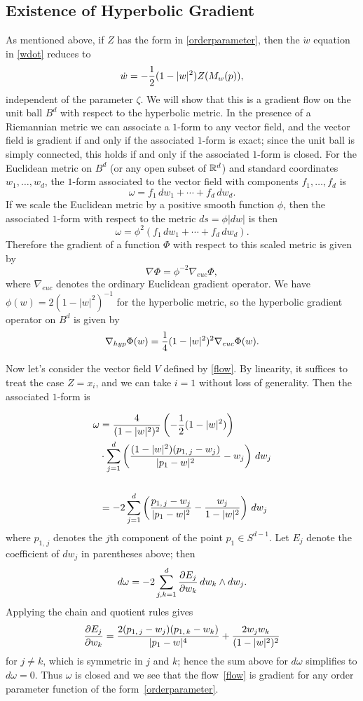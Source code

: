 \documentclass[%
 aip,
 amsmath,amssymb,
 reprint,%
]{revtex4-1}
\begin{document}
\subsection{\label{sec:level2}Existence of Hyperbolic Gradient}
As mentioned above, if $Z$ has the form in \eqref{orderparameter}, then the $\dot w$ equation in \eqref{wdot} reduces to
\begin{equation}
\dot w = -{1 \over 2} (1-|w|^2) Z(M_w(p)), \label{flow}
\end{equation}
independent of the parameter $\zeta$.  We will show that this is a gradient flow on the unit ball $B^d$ with respect to the hyperbolic metric.  In the presence of a Riemannian metric we can associate a $1$-form to any vector field, and the vector field is gradient if and only if the associated $1$-form is exact; since the unit ball is simply connected, this holds if and only if the associated 
$1$-form is closed.  For the Euclidean metric on $B^d$ (or any open subset of ${\Bbb R}^d$) and standard coordinates $w_1,  \dots, w_d$, the $1$-form associated to the vector field with components $f_1,  \dots, f_d$ is
$$
\omega = f_1 \, dw_1 + \cdots + f_d \, dw_d.
$$
If we scale the Euclidean metric by a positive smooth function $\phi$, then the associated $1$-form with respect to the metric $ds = \phi |dw|$  is then
$$
\omega = \phi^2 ( f_1 \, dw_1 + \cdots + f_d \, dw_d).
$$
Therefore the gradient of a function $\Phi$ with respect to this scaled metric is given by
$$
\nabla \Phi = \phi ^{-2} \nabla_{euc} \Phi,
$$
where $\nabla_{euc}$ denotes the ordinary Euclidean gradient operator. We have $\phi(w) = 2(1-|w|^2)^{-1}$ for the hyperbolic metric, so the hyperbolic gradient operator on $B^d$ is given by
$$
\nabla_{hyp} \Phi (w) = {1 \over 4} (1-|w|^2)^2 \nabla_{euc} \Phi (w).
$$


Now let's consider the vector field $V$ defined by \eqref{flow}.  By linearity, it suffices to treat the case $Z = x_i$, and we can take $i=1$ without loss of generality.   Then the associated $1$-form is

\begin{align*}
\omega &= {4  \over ( 1- |w|^2)^2 } \left( -{1 \over 2} (1-|w|^2)  \right) \\ &\cdot \sum_{j=1}^d  \left( {(1-|w|^2) (p_{1,\, j}  - w_j)  \over | p_1 - w|^2} - w_j \right) \, dw_j \cr \\
&= -2  \sum_{j=1}^d  \left(  {p_{1,\,  j}  - w_j  \over | p_1 - w|^2 } - { w_j  \over 1-|w|^2} \right) \, dw_j 
\end{align*}
where $p_{1, \, j}$ denotes the $j$th component of the point $p_1 \in S^{d-1}$.  Let  $E_j$ denote the coefficient of $dw_j$ in parentheses above; then
$$
d \omega = -2 \sum_{j, k = 1}^d {\partial E_j \over \partial w_k} \, dw_k \wedge dw_j.
$$
 Applying the chain and quotient rules gives
$$
{\partial E_j \over \partial w_k} = { 2(p_{1,\, j}  - w_j) (p_{1,\, k}  - w_k) \over |p_1-w|^4} + {2 w_j w_k \over (1-|w|^2)^2}
$$
for $j \ne k$, which is symmetric in $j$ and $k$; hence the sum above for $d \omega$ simplifies to $d \omega = 0$. Thus $\omega$  is closed and we see that the flow~\eqref{flow} is gradient for any order parameter function of the form~\eqref{orderparameter}.
\end{document}
